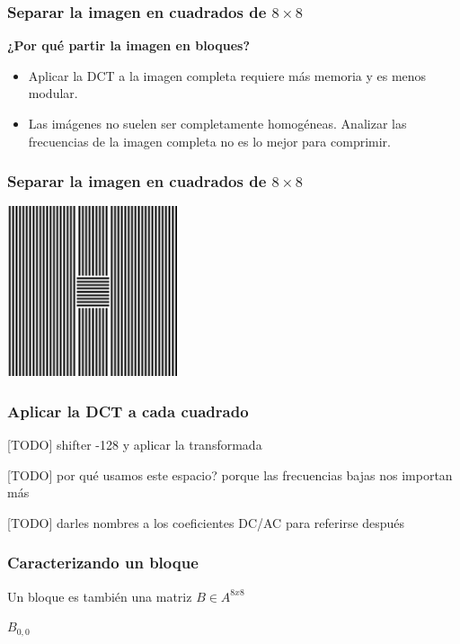 \documentclass{beamer}
\begin{document}
\begin{frame}
    \frametitle{Separar la imagen en cuadrados de $8 \times 8$}
    \textbf{¿Por qué partir la imagen en bloques?}
    \begin{itemize}
        \item Aplicar la DCT a la imagen completa requiere más memoria y es menos modular. %
        \item Las imágenes no suelen ser completamente homogéneas. Analizar las frecuencias de la imagen completa no es lo mejor para comprimir.
    \end{itemize}
\end{frame}

\begin{frame}
    \frametitle{Separar la imagen en cuadrados de $8 \times 8$}
    \includegraphics[width=5cm, height=5cm]{fig/no_homogenea.png}
\end{frame}

\begin{frame}
    \frametitle{Aplicar la DCT a cada cuadrado}
    [TODO] shifter -128 y aplicar la transformada

    [TODO] por qué usamos este espacio? porque las frecuencias bajas nos importan más

    [TODO] darles nombres a los coeficientes DC/AC para referirse después
\end{frame}

\begin{frame}
    \frametitle{Caracterizando un bloque}
    Un bloque es también una matriz $B \in A^{8x8}$

    \vspace{5mm}
    $B_{0,0}$
    

    
\end{frame}
\end{document}
